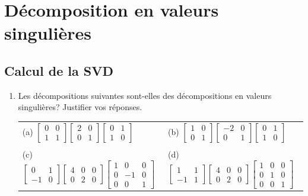 \chapter{Décomposition en valeurs singulières}



\section{Calcul de la SVD}
\begin{enumerate}
	\item Les décompositions suivantes sont-elles des décompositions en valeurs singulières? Justifier vos réponses.
	
	\begin{tabular}{ll}
	\\
		(a) $\displaystyle \begin{bmatrix} 0 & 0 \\ 1 & 1\end{bmatrix}  \begin{bmatrix} 2 & 0 \\ 0 & 1 \end{bmatrix} \begin{bmatrix} 0 & 1 \\ 1 & 0\end{bmatrix}$
		&
		(b) $\displaystyle \begin{bmatrix} 1 & 0 \\ 0 & 1\end{bmatrix}  \begin{bmatrix} -2 & 0 \\ 0 & 1 \end{bmatrix} \begin{bmatrix} 0 & 1 \\ 1 & 0\end{bmatrix}$\\ \\
		(c) $\displaystyle \begin{bmatrix} 0 & 1 \\ -1 & 0\end{bmatrix}  \begin{bmatrix} 4 & 0 & 0 \\ 0 & 2 & 0 \end{bmatrix} \begin{bmatrix} 1 & 0 & 0 \\ 0 & -1 & 0 \\ 0 & 0 & 1 \end{bmatrix}$
		&
		(d) $\displaystyle \begin{bmatrix} 1 & 1 \\ -1 & 1\end{bmatrix}  \begin{bmatrix} 4 & 0 & 0 \\ 0 & 2 & 0 \end{bmatrix} \begin{bmatrix} 1 & 0 & 0 \\ 0 & 1 & 0 \\ 0 & 0 & 1 \end{bmatrix}$
	\end{tabular}
\end{enumerate}
